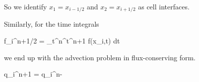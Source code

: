 So we identify $x_1 = x_{i-1/2}$ and $x_2 = x_{i+1/2}$ as cell interfaces.

Similarly, for the time integrals

\beq
f_i^{n+1/2} =  \int_{t^n}^{t^{n+1}} f(x_i,t) dt 
\eeq





we end up with the advection problem in flux-conserving form.

\beq
q_i^{n+1} = q_i^{n}- 
\label{eq:advect-conserve}
\eeq







